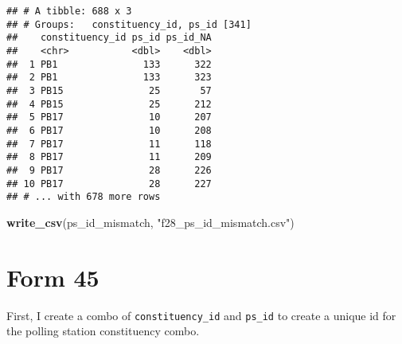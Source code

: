 \documentclass[]{article}
\newenvironment{Shaded}{\begin{snugshade}}{\end{snugshade}}
\newcommand{\DataTypeTok}[1]{\textcolor[rgb]{0.13,0.29,0.53}{#1}}
\newcommand{\DecValTok}[1]{\textcolor[rgb]{0.00,0.00,0.81}{#1}}
\newcommand{\KeywordTok}[1]{\textcolor[rgb]{0.13,0.29,0.53}{\textbf{#1}}}
\newcommand{\NormalTok}[1]{#1}
\newcommand{\OperatorTok}[1]{\textcolor[rgb]{0.81,0.36,0.00}{\textbf{#1}}}
\newcommand{\StringTok}[1]{\textcolor[rgb]{0.31,0.60,0.02}{#1}}
\begin{document}
\begin{Shaded}
\end{Shaded}

\begin{verbatim}
## # A tibble: 688 x 3
## # Groups:   constituency_id, ps_id [341]
##    constituency_id ps_id ps_id_NA
##    <chr>           <dbl>    <dbl>
##  1 PB1               133      322
##  2 PB1               133      323
##  3 PB15               25       57
##  4 PB15               25      212
##  5 PB17               10      207
##  6 PB17               10      208
##  7 PB17               11      118
##  8 PB17               11      209
##  9 PB17               28      226
## 10 PB17               28      227
## # ... with 678 more rows
\end{verbatim}

\begin{Shaded}
\begin{Highlighting}[]
\KeywordTok{write_csv}\NormalTok{(ps_id_mismatch, }\StringTok{"f28_ps_id_mismatch.csv"}\NormalTok{)}
\end{Highlighting}
\end{Shaded}

\hypertarget{form-45}{%
\section{Form 45}\label{form-45}}

First, I create a combo of \texttt{constituency\_id} and \texttt{ps\_id}
to create a unique id for the polling station constituency combo.

\begin{Shaded}
\end{Shaded}
\end{document}
